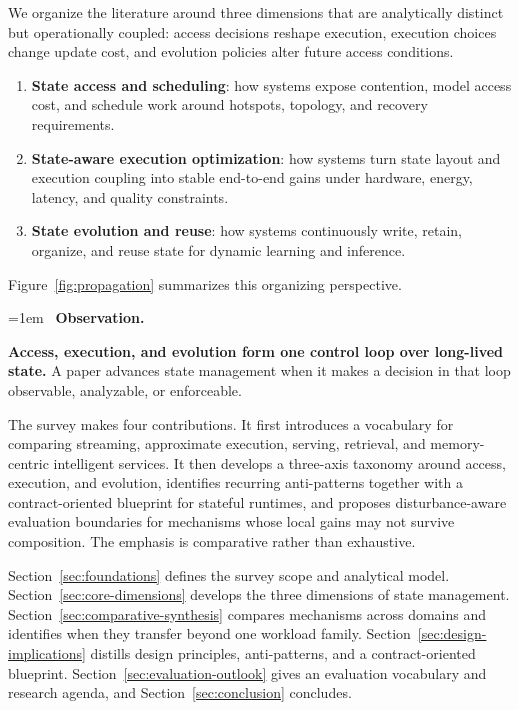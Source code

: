 \documentclass[manuscript]{acmart}
\newenvironment{keybox}{%
  \par\smallskip\noindent
  \begin{lrbox}{\keyboxcontent}
  \begin{minipage}{\dimexpr\linewidth-2\fboxsep-2\fboxrule-1.5pt\relax}
  \raggedright
  \emergencystretch=1em
  {\color{keyborder}\faLightbulbO}\ \textbf{\textcolor{keyborder}{Observation.}}\space
}{%
  \end{minipage}
  \end{lrbox}
  \fcolorbox{keyborder}{keybg}{\usebox{\keyboxcontent}}%
  \par\smallskip
}
\begin{document}
We organize the literature around three dimensions that are analytically distinct but operationally coupled: access decisions reshape execution, execution choices change update cost, and evolution policies alter future access conditions.

\begin{enumerate}[leftmargin=*]
\item \textbf{State access and scheduling}: how systems expose contention, model access cost, and schedule work around hotspots, topology, and recovery requirements.
\item \textbf{State-aware execution optimization}: how systems turn state layout and execution coupling into stable end-to-end gains under hardware, energy, latency, and quality constraints.
\item \textbf{State evolution and reuse}: how systems continuously write, retain, organize, and reuse state for dynamic learning and inference.
\end{enumerate}
Figure~\ref{fig:propagation} summarizes this organizing perspective.

\begin{keybox}
\textbf{Access, execution, and evolution form one control loop over long-lived state.} A paper advances state management when it makes a decision in that loop observable, analyzable, or enforceable.
\end{keybox}

The survey makes four contributions. It first introduces a vocabulary for comparing streaming, approximate execution, serving, retrieval, and memory-centric intelligent services. It then develops a three-axis taxonomy around access, execution, and evolution, identifies recurring anti-patterns together with a contract-oriented blueprint for stateful runtimes, and proposes disturbance-aware evaluation boundaries for mechanisms whose local gains may not survive composition. The emphasis is comparative rather than exhaustive.

Section~\ref{sec:foundations} defines the survey scope and analytical model. Section~\ref{sec:core-dimensions} develops the three dimensions of state management. Section~\ref{sec:comparative-synthesis} compares mechanisms across domains and identifies when they transfer beyond one workload family. Section~\ref{sec:design-implications} distills design principles, anti-patterns, and a contract-oriented blueprint. Section~\ref{sec:evaluation-outlook} gives an evaluation vocabulary and research agenda, and Section~\ref{sec:conclusion} concludes.
\end{document}
